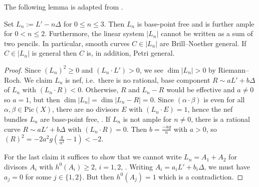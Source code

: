The following lemma is adapted from \cite[Prop.\ 1]{V2}.
\begin{lem}
\notready \label{BNP-gen}
 Set $L_n:=L'-n\Delta$ for $0 \leq n \leq 3$.  Then $L_n$ is base-point free and is further ample for $0<n \leq 2$. Furthermore, the linear system $|L_n|$ cannot be written as a sum of two pencils. In particular, smooth curves $C \in |L_n|$ are Brill--Noether general. If $C \in |L_n|$ is general then $C$ is, in addition, Petri general.
\end{lem}
\begin{proof}
Since $(L_n)^2 \geq 0$ and $(L_n \cdot L')>0$, we see $\dim |L_n|>0$ by Riemann--Roch. We claim $L_n$ is nef, i.e.\ there is no rational, base component $R \sim aL'+b\Delta $ of $L_n$ with $(L_n \cdot R)<0$. Otherwise, $R$ and $L_n-R$ would be effective and $a \neq 0$ so $a =1$, but then $\dim |L_n|=\dim|L_n-R|=0$. Since $(\alpha \cdot \beta)$ is even for all $\alpha, \beta \in \mathrm{Pic}(X)$, there are no divisors $E$ with $(L_n \cdot E)=1$, hence the nef bundles $L_n$ are base-point free, \cite[Prop.\ 8]{mayer}. If $L_n$ is not ample for $n \neq 0$, there is a rational curve $R\sim aL'+b\Delta$ with $(L_n \cdot R)=0$. Then $b=\frac{-ag}{n}$ with $a>0$, so $(R)^2=-2a^2g(\frac{g}{n^2}-1)<-2$.

For the last claim it suffices to show that we cannot write $L_n=A_1+A_2$ for divisors $A_i$ with $h^0(A_i)\geq 2$, $i=1,2$, \cite{lazarsfeld-BNP}. Writing $A_i=a_i L'+b_i \Delta$, we must have $a_j=0$ for some $j\in \{1,2 \}$. But then $h^0(A_j)=1$ which is a contradiction.
\end{proof}

